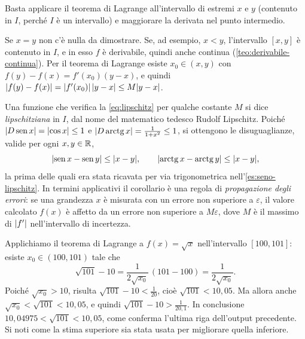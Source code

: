 \begin{schema}
\end{schema}

\begin{strategia}
Basta applicare il teorema di Lagrange all'intervallo di estremi $x$ e $y$ (contenuto in
$I$, perché $I$ è un intervallo) e maggiorare la derivata nel punto intermedio.
\end{strategia}

\begin{dimostrazione}
Se $x=y$ non c'è nulla da dimostrare. Se, ad esempio, $x<y$, l'intervallo $[x,y]$ è
contenuto in $I$, e in esso $f$ è derivabile, quindi anche continua
(\cref{teo:derivabile-continua}). Per il teorema di Lagrange esiste $x_{0}\in(x,y)$ con
$f(y)-f(x)=f'(x_{0})(y-x)$, e quindi
$\lvert f(y)-f(x)\rvert=\lvert f'(x_{0})\rvert\,\lvert y-x\rvert\le M\lvert y-x\rvert$.
\end{dimostrazione}

Una funzione che verifica la \eqref{eq:lipschitz} per qualche costante $M$ si dice
\emph{lipschitziana} in $I$, dal nome del matematico tedesco
Rudolf Lipschitz. Poiché $\lvert D\operatorname{sen} x\rvert=\lvert \cos x\rvert\le1$ e
$\lvert D\operatorname{arctg}x\rvert=\frac1{1+x^{2}}\le1$, si ottengono le disuguaglianze, valide
per ogni $x,y\in\mathbb{R}$,
\begin{equation}\label{eq:sen-arctg-lipschitz}
  \lvert \operatorname{sen} x-\operatorname{sen} y\rvert\le\lvert x-y\rvert, \qquad
  \lvert \operatorname{arctg}x-\operatorname{arctg}y\rvert\le\lvert x-y\rvert ,
\end{equation}
la prima delle quali era stata ricavata per via trigonometrica nell'\cref{es:seno-lipschitz}.
In termini applicativi il corollario è una regola di \emph{propagazione degli errori}:
se una grandezza $x$ è misurata con un errore non superiore a $\varepsilon$, il valore
calcolato $f(x)$ è affetto da un errore non superiore a $M\varepsilon$, dove $M$ è il
massimo di $\lvert f'\rvert$ nell'intervallo di incertezza.

\begin{esempio}\label{es:stima-radice}
Applichiamo il teorema di Lagrange a $f(x)=\sqrt x$ nell'intervallo $[100,101]$:
esiste $x_{0}\in(100,101)$ tale che
\[
  \sqrt{101}-10=\frac{1}{2\sqrt{x_{0}}}\,(101-100)=\frac{1}{2\sqrt{x_{0}}} .
\]
Poiché $\sqrt{x_{0}}>10$, risulta $\sqrt{101}-10<\frac1{20}$, cioè $\sqrt{101}<10{,}05$.
Ma allora anche $\sqrt{x_{0}}<\sqrt{101}<10{,}05$, e quindi
$\sqrt{101}-10>\frac{1}{20{,}1}$. In conclusione
$10{,}04975<\sqrt{101}<10{,}05$, come conferma l'ultima riga dell'output precedente.
Si noti come la stima superiore sia stata usata per migliorare quella inferiore.
\end{esempio}

